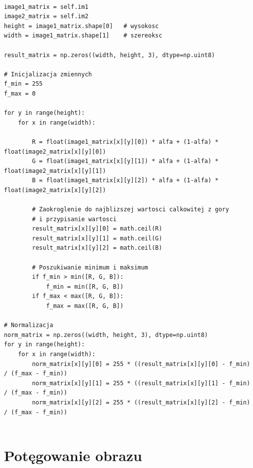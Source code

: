 \documentclass[final,a4paper,openany,12pt]{mwbk}
\begin{document}
\begin{lstlisting}[caption=Mieszanie obrazów barwowych z określonym współczynnikiem]

image1_matrix = self.im1
image2_matrix = self.im2
height = image1_matrix.shape[0]   # wysokosc
width = image1_matrix.shape[1]    # szereoksc

result_matrix = np.zeros((width, height, 3), dtype=np.uint8)

# Inicjalizacja zmiennych
f_min = 255
f_max = 0

for y in range(height):
    for x in range(width):  

        R = float(image1_matrix[x][y][0]) * alfa + (1-alfa) * float(image2_matrix[x][y][0])
        G = float(image1_matrix[x][y][1]) * alfa + (1-alfa) * float(image2_matrix[x][y][1])
        B = float(image1_matrix[x][y][2]) * alfa + (1-alfa) * float(image2_matrix[x][y][2])

        # Zaokroglenie do najblizszej wartosci calkowitej z gory
        # i przypisanie wartosci
        result_matrix[x][y][0] = math.ceil(R)
        result_matrix[x][y][1] = math.ceil(G)
        result_matrix[x][y][2] = math.ceil(B)

        # Poszukiwanie minimum i maksimum                
        if f_min > min([R, G, B]):
            f_min = min([R, G, B])
        if f_max < max([R, G, B]):
            f_max = max([R, G, B])

# Normalizacja
norm_matrix = np.zeros((width, height, 3), dtype=np.uint8)
for y in range(height):
    for x in range(width):
        norm_matrix[x][y][0] = 255 * ((result_matrix[x][y][0] - f_min) / (f_max - f_min))
        norm_matrix[x][y][1] = 255 * ((result_matrix[x][y][1] - f_min) / (f_max - f_min))
        norm_matrix[x][y][2] = 255 * ((result_matrix[x][y][2] - f_min) / (f_max - f_min))


\end{lstlisting}

\section{ Potęgowanie obrazu}

\hfill
\\\\
\indent
\end{document}
